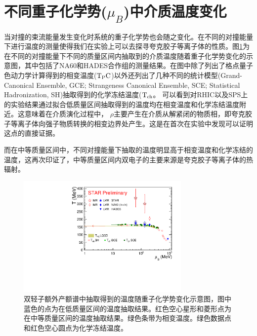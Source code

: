 \section{不同重子化学势($\mu_B$)中介质温度变化}

当对撞的束流能量发生变化时系统的重子化学势也会随之变化。在不同的对撞能量下进行温度的测量使得我们在实验上可以去探寻夸克胶子等离子体的性质。图\ref{fig:T_vs_uB_comparedNA60_HADES_phaseTransition_logx_4QM2022}为在不同的对撞能量下不同的质量区间内抽取到的介质温度随着重子化学势变化的示意图，其中包括了NA60和HADES合作组\cite{HADES:2019auv}的测量结果。在图中除了列出了格点量子色动力学计算得到的相变温度($\rm{T_PC}$)以外还列出了几种不同的统计模型(Grand-Canonical Ensemble, GCE;  Strangeness Canonical Ensemble, SCE;  Statistical Hadronization, SH\cite{STAR:2017sal,Andronic:2017pug})抽取得到的化学冻结温度($\rm{T_{ch}}$。
可以看到对RHIC以及SPS上的实验结果通过拟合低质量区间抽取得到的温度均在相变温度和化学冻结温度附近。这意味着在介质演化过程中， $\rho$主要产生在介质从解紧闭的物质相，即夸克胶子等离子体向强子物质转换的相变边界处产生。这是在首次在实验中发现可以证明这点的直接证据。

而在中等质量区间中，不同对撞能量下抽取的温度明显高于相变温度和化学冻结的温度，这再次印证了，中等质量区间内双电子的主要来源是夸克胶子等离子体的热辐射。

\begin{figure}[htb]
    \begin{center}
    \includegraphics[width=0.75\textwidth,clip]{figures/Chapter4/T_vs_uB_comparedNA60_HADES_phaseTransition_logx_4QM2022.pdf}
    \end{center}
    \caption[双轻子额外产额谱中抽取得到的温度随重子化学势变化示意图]{双轻子额外产额谱中抽取得到的温度随重子化学势变化示意图，图中蓝色的点为在低质量区间的温度抽取结果。红色空心星形和菱形点为在中等质量区间的温度抽取结果。绿色条带为相变温度。绿色数据点和红色空心圆点为化学冻结温度。}
    \label{fig:T_vs_uB_comparedNA60_HADES_phaseTransition_logx_4QM2022}
\end{figure}